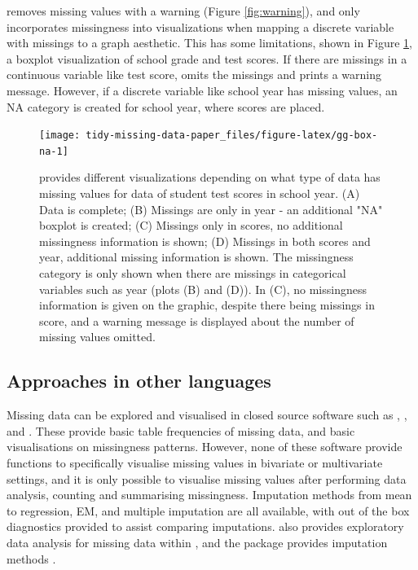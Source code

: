 \documentclass[
]{jss}
\begin{document}
 removes missing values with a warning (Figure \ref{fig:warning}), and only incorporates missingness into visualizations when mapping a discrete variable with missings to a graph aesthetic. This has some limitations, shown in Figure \ref{fig:gg-box-na}, a boxplot visualization of school grade and test scores. If there are missings in a continuous variable like test score,  omits the missings and prints a warning message. However, if a discrete variable like school year has missing values, an NA category is created for school year, where scores are placed.

\begin{CodeChunk}
\begin{figure}

{\centering \texttt{[image: tidy-missing-data-paper\_files/figure-latex/gg-box-na-1]} 

}

\caption[ provides different visualizations depending on what type of data has missing values for data of student test scores in school year]{ provides different visualizations depending on what type of data has missing values for data of student test scores in school year. (A) Data is complete; (B) Missings are only in year - an additional "NA" boxplot is created; (C) Missings only in scores, no additional missingness information is shown; (D) Missings in both scores and year, additional missing information is shown. The missingness category is only shown when there are missings in categorical variables such as year (plots (B) and (D)). In (C), no missingness information is given on the graphic, despite there being missings in score, and a warning message is displayed about the number of missing values omitted.}\label{fig:gg-box-na}
\end{figure}
\end{CodeChunk}

\hypertarget{approaches-in-other-languages}{%
\subsection{Approaches in other languages}\label{approaches-in-other-languages}}

Missing data can be explored and visualised in closed source software such as , , and . These provide basic table frequencies of missing data, and basic visualisations on missingness patterns. However, none of these software provide functions to specifically visualise missing values in bivariate or multivariate settings, and it is only possible to visualise missing values after performing data analysis, counting and summarising missingness. Imputation methods from mean to regression, EM, and multiple imputation are all available, with out of the box diagnostics provided to assist comparing imputations.  also provides exploratory data analysis for missing data within  \citep{Bilogur2018}, and the  package provides imputation methods \citep{scikit-learn}.
\end{document}

